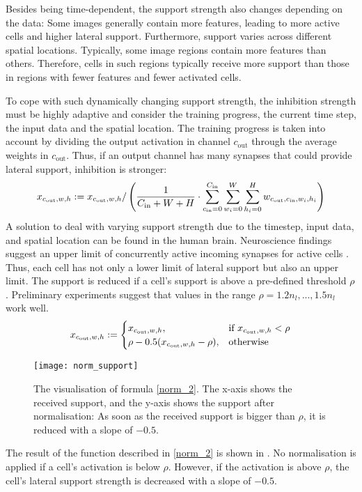 Besides being time-dependent, the support strength also changes depending on the data:
Some images generally contain more features, leading to more active cells and higher lateral support. Furthermore, support varies across different spatial locations. Typically, some image regions contain more features than others. Therefore, cells in such regions typically receive more support than those in regions with fewer features and fewer activated cells.

To cope with such dynamically changing support strength, the inhibition strength must be highly adaptive and consider the training progress, the current time step, the input data and the spatial location. 
The training progress is taken into account by dividing the output activation in channel $c_{\text{out}}$ through the average weights in $c_{\text{out}}$. Thus, if an output channel has many synapses that could provide lateral support, inhibition is stronger:
%
\begin{align}\eqlbl{norm_1}
    x_{c_{\text{out}},w,h} := x_{c_{\text{out}},w,h} / \left( \frac{1}{C_{\text{in}} + W + H} \cdot \sum_{c_{\text{in}}=0}^{C_{\text{in}}} \sum_{w_i=0}^{W} \sum_{h_i=0}^{H} w_{c_{\text{out}}, c_{\text{in}},w_i,h_i}  \right)
\end{align}
%
A solution to deal with varying support strength due to the timestep, input data, and spatial location can be found in the human brain.
Neuroscience findings suggest an upper limit of concurrently active incoming synapses for active cells . Thus, each cell has not only a lower limit of lateral support but also an upper limit.
The support is reduced if a cell's support is above a pre-defined threshold $\rho$.
Preliminary experiments suggest that values in the range $\rho = 1.2n_l, ..., 1.5n_l$ work well.
%
\begin{align}\eqlbl{norm_2}
	x_{c_{\text{out}},w,h} := \begin{cases}
      		x_{c_{\text{out}},w,h}, & \text{if } x_{c_{\text{out}},w,h} < \rho \\
      		\rho - 0.5(x_{c_{\text{out}},w,h} - \rho), & \text{otherwise}
    	\end{cases}
\end{align}
%
\begin{figure}[h]
    \centering
    \texttt{[image: norm\_support]}
    \caption[Inhibition for too many activated cells]{The visualisation of formula \eqref{norm_2}. The x-axis shows the received support, and the y-axis shows the support after normalisation: As soon as the received support is bigger than $\rho$, it is reduced with a slope of $-0.5$.}
\end{figure}
The result of the function described in \eqref{norm_2} is shown in . No normalisation is applied if a cell's activation is below $\rho$. However, if the activation is above $\rho$, the cell's lateral support strength is decreased with a slope of $-0.5$.


